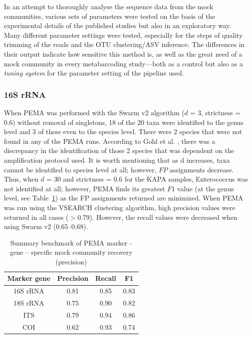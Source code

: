       In an attempt to thoroughly analyse the sequence data from the mock communities, various sets of parameters were tested on the basis of the experimental details of the published studies but also in an exploratory way. 
      Many different parameter settings were tested, especially for the steps of quality trimming of the reads and the OTU clustering/ASV inference. 
      The differences in their output indicate how sensitive this method is, as well as the great need of a mock community in every metabarcoding study—both as a control but also as a \textit{tuning system} for the parameter setting of the pipeline used.

   \subsubsection*{16S rRNA}

      When PEMA was performed with the Swarm v2 algorithm ($d$ = 3, strictness = 0.6) without removal of singletons, 18 of the 20 taxa were identified to the genus level and 3 of these even to the species level. 
      There were 2 species that were not found in any of the PEMA runs. 
      According to Gohl et al. \cite{gohl2016systematic}, there was a discrepancy in the identification of those 2 species that was dependent on the amplification protocol used. 
      It is worth mentioning that as d increases, taxa cannot be identified to species level at all; 
      however, $FP$ assignments decrease. 
      Thus, when $d$ = 30 and strictness = 0.6 for the KAPA samples, Enterococcus was not identified at all; 
      however, PEMA finds its greatest $F1$ value (at the genus level, see Table~\ref{table:pema-precision}) as the FP assignments returned are minimized. 
      When PEMA was run using the VSEARCH clustering algorithm, high precision values were returned in all cases ($>$0.79). 
      However, the recall values were decreased when using Swarm v2 (0.65–0.68).

      \begin{table}
         \begin{center}
            \begin{tabular}{@{}cccc@{}}
               \toprule
               \multicolumn{1}{c}{\textbf{Marker gene}} & \multicolumn{1}{c}{\textbf{Precision}} & \multicolumn{1}{c}{\textbf{Recall}} & \multicolumn{1}{c}{\textbf{F1}} \\ \midrule
               16S rRNA & 0.81 & 0.85 & 0.83 \\
               18S rRNA & 0.75 & 0.90 & 0.82 \\
               ITS & 0.79 & 0.94 & 0.86 \\
               COI & 0.62 & 0.93 & 0.74
               \end{tabular}
               \caption[Summary benchmark of PEMA marker - gene - specific mock community recovery]{Summary benchmark of PEMA marker - gene – specific mock community recovery (precision)}
               \label{table:pema-precision}
         \end{center}
      \end{table}




